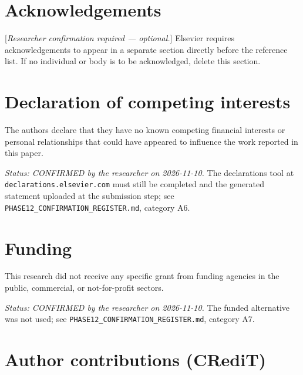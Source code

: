 \documentclass[11pt,a4paper]{article}
\theoremstyle{plain}
\theoremstyle{definition}
\theoremstyle{remark}
\begin{document}

\section*{Acknowledgements}
\label{sec:acknowledgements}

[\emph{Researcher confirmation required --- optional.}] Elsevier requires
acknowledgements to appear in a separate section directly before the reference
list. If no individual or body is to be acknowledged, delete this section.

\section*{Declaration of competing interests}
\label{sec:competinginterests}

The authors declare that they have no known competing financial interests or
personal relationships that could have appeared to influence the work
reported in this paper.

\emph{Status: CONFIRMED by the researcher on 2026-11-10.} The declarations
tool at \texttt{declarations.elsevier.com} must still be completed and the
generated statement uploaded at the submission step; see
\texttt{PHASE12\_CONFIRMATION\_REGISTER.md}, category A6.

\section*{Funding}
\label{sec:funding}

This research did not receive any specific grant from funding agencies in the
public, commercial, or not-for-profit sectors.

\emph{Status: CONFIRMED by the researcher on 2026-11-10.} The funded
alternative was not used; see
\texttt{PHASE12\_CONFIRMATION\_REGISTER.md}, category A7.

\section*{Author contributions (CRediT)}
\label{sec:credit}
\end{document}
